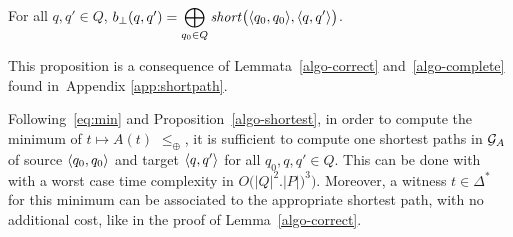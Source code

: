 \begin{proposition}\label{algo-shortest}
For all $q, q' \in Q$, 
$b_\bot(q, q') = \displaystyle\bigoplus_{q_0 \in Q} \mathit{short}\bigl(\< q_0, q_0>, \< q, q'>\bigr)$.
\end{proposition}
This proposition is a consequence of Lemmata~\ref{algo-correct} and~\ref{algo-complete} 
found in~Appendix \ref{app:shortpath}.

\medskip\noindent
Following~\eqref{eq:min} and Proposition~\ref{algo-shortest}, 
in order to compute the minimum of $t \mapsto A(t)$ \wrt $\leq_\oplus$, 
it is sufficient to compute one shortest paths in $\mathcal{G}_{A}$ of source
$\<q_0, q_0>$ and target $\<q, q'>$ for all $q_0, q, q' \in Q$.
This can be done with~\cite{Mohri02semiring} 
with a worst case time complexity in $O\bigl(|Q|^2.|P|)^3\bigr)$. 
Moreover, a witness $t \in \Delta^*$ for this minimum can be associated to the appropriate
shortest path, with no additional cost, like in the proof of Lemma~\ref{algo-correct}.





